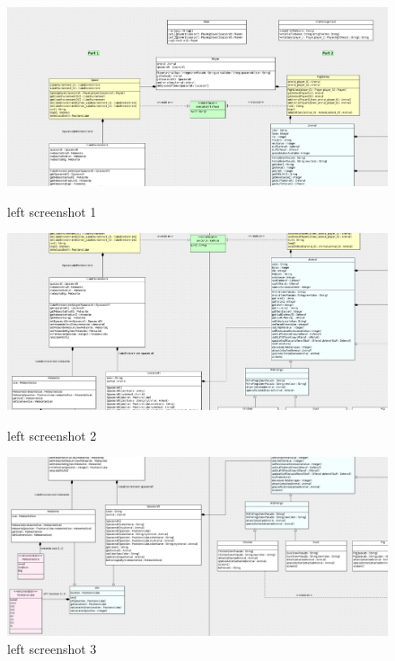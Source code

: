 \begin{figure}
  \includegraphics[width=450pt]{../../Images/1_1-2_1.png}
  \caption{\small left screenshot 1}
  \includegraphics[width=450pt]{../../Images/1_1-1_2-2_2.png}
  \caption{\small left screenshot 2}
  \includegraphics[width=450pt]{../../Images/1_2-2_3.png}
  \caption{\small left screenshot 3}
\end{figure}

